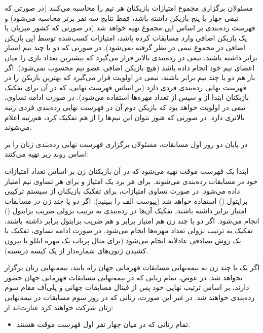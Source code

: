 مسئولان برگزاری مجموع امتیازات بازیکنان هر تیم را محاسبه می‌کنند (در صورتی که تیمی چهار یا پنج بازیکن داشته باشد، فقط نتایج سه نفر برتر محاسبه می‌شود) و فهرست رده‌بندی بر اساس این مجموع تهیه خواهد شد (در صورتی که کشور میزبان یا  یک بازیکن اضافی وارد مسابقات کرده باشد، امتیازات کسب‌شده توسط این بازیکن اضافی در مجموع تیمی در نظر گرفته نمی‌شود). در صورتی که دو یا چند تیم امتیاز برابر داشته باشند، تیمی در رده‌بندی بالاتر قرار می‌گیرد که بیشترین تعداد بازی را میان اعضای تیم خود انجام داده باشد (هیچ بازیکن اضافی عضو تیم محسوب نمی‌شود). اگر باز هم دو یا چند تیم برابر باشند، تیمی در اولویت قرار می‌گیرد که بهترین بازیکن را در فهرست نهایی رده‌بندی فردی دارد (بر اساس فهرست نهایی، که در آن برای تفکیک بازیکنان ابتدا از  و سپس از تعداد مهره‌ها استفاده می‌شود). در صورت ادامه تساوی، تیمی در اولویت خواهد بود که بازیکن دوم آن در فهرست نهایی رده‌بندی فردی رتبه بالاتری دارد. در صورتی که هنوز نتوان این تیم‌ها را از هم تفکیک کرد، هم‌رتبه اعلام می‌شوند.


در پایان دو روز اول مسابقات، مسئولان برگزاری فهرست نهایی رده‌بندی زنان را بر اساس روند زیر تهیه می‌کنند:


ابتدا یک فهرست موقت تهیه می‌شود که در آن بازیکنان زن بر اساس تعداد امتیازات خود در مسابقات رده‌بندی می‌شوند. برای هر برد یک امتیاز و برای هر تساوی نیم امتیاز داده می‌شود. در صورت تساوی امتیازات، برای تفکیک بازیکنان از سیستم ترکیبی برایتول () استفاده خواهد شد (پیوست الف را ببینید). اگر دو یا چند زن در مسابقات امتیاز برابر داشته باشند، تفکیک آن‌ها در رده‌بندی به ترتیب نزولی ضریب برایتول () انجام می‌شود. اگر دو یا چند زن هم امتیاز برابر و هم ضریب برایتول برابر داشته باشند، تفکیک به ترتیب نزولی تعداد مهره‌ها انجام می‌شود. در صورت ادامه تساوی، تفکیک با یک روش تصادفی عادلانه انجام می‌شود (برای مثال پرتاب یک مهره اتللو یا بیرون کشیدن ژتون‌های شماره‌دار از یک کیسه دربسته).


اگر یک یا چند زن به نیمه‌نهایی مسابقات قهرمانی جهان راه یابند، نیمه‌نهایی زنان برگزار نخواهد شد. در عوض، تمام زنانی که در نیمه‌نهایی مسابقات قهرمانی جهان حضور دارند، بر اساس ترتیب نهایی خود پس از فینال مسابقات جهانی و پلی‌آف مقام سوم رده‌بندی خواهند شد. در غیر این صورت، زنانی که در روز سوم مسابقات در نیمه‌نهایی زنان شرکت خواهند کرد عبارت‌اند از:

\begin{itemize}
  \item تمام زنانی که در میان چهار نفر اول فهرست موقت هستند.
\end{itemize}

